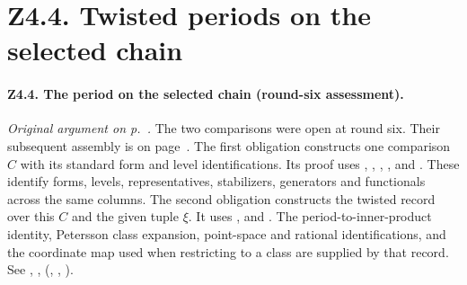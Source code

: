 \section*{Z4.4. Twisted periods on the selected chain}

\paragraph{Z4.4. The period on the selected chain (round-six assessment).}\label{r6:review:Z4.4} \emph{Original argument on p.~\pageref{sec:r5-z44}.} 
The two comparisons were open at round six. Their subsequent assembly is on page~\pageref{r12:assembly}.
The first obligation constructs one comparison $C$ with its standard form and level identifications. Its proof uses
,
,
,
,
and . These identify forms, levels, representatives, stabilizers, generators and functionals across the same columns. The second obligation constructs the twisted record over this $C$ and the given tuple $\xi$. It uses ,
 and
. The period-to-inner-product identity, Petersson class expansion, point-space and rational identifications, and the coordinate map used when restricting to a class are supplied by that record. See , ,  (, , ).

